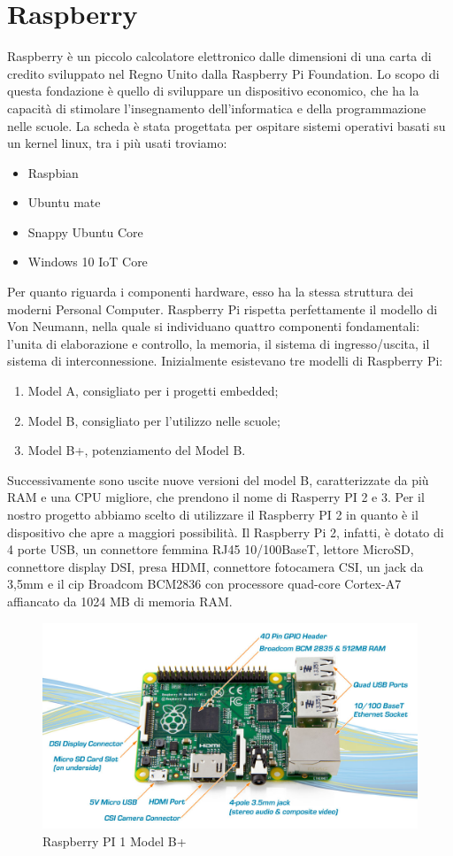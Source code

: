 \section{Raspberry}
Raspberry è un piccolo calcolatore elettronico dalle dimensioni di una
carta di credito sviluppato nel Regno Unito dalla Raspberry Pi
Foundation. Lo scopo di questa fondazione è quello di sviluppare un
dispositivo economico, che ha la capacità di stimolare l'insegnamento
dell'informatica e della programmazione nelle scuole. La scheda è stata
progettata per ospitare sistemi operativi basati su un kernel linux, tra i
più usati troviamo:
\begin{itemize}
\item Raspbian
\item Ubuntu mate
\item Snappy Ubuntu Core
\item Windows 10 IoT Core
\end{itemize}
Per quanto riguarda i componenti hardware, esso ha la stessa struttura
dei moderni Personal Computer. Raspberry Pi rispetta perfettamente il
modello di Von Neumann, nella quale si individuano quattro componenti
fondamentali: l'unita di elaborazione e controllo, la memoria, il sistema
di ingresso/uscita, il sistema di interconnessione. Inizialmente esistevano tre modelli di Raspberry Pi:
\begin{enumerate}
\item Model A, consigliato per i progetti embedded;
\item Model B, consigliato per l'utilizzo nelle scuole;
\item Model B+, potenziamento del Model B.
\end{enumerate}
Successivamente sono uscite nuove versioni del model B, caratterizzate da più RAM e una CPU migliore, che prendono il nome di Rasperry PI 2 e 3.
Per il nostro progetto abbiamo scelto di utilizzare il Raspberry PI 2 in
quanto è il dispositivo che apre a maggiori possibilità. Il Raspberry Pi 2,
infatti, è dotato di 4 porte USB, un connettore femmina RJ45
10/100BaseT, lettore MicroSD, connettore display DSI, presa HDMI,
connettore fotocamera CSI, un jack da 3,5mm e il cip Broadcom
BCM2836 con processore quad-core Cortex-A7 affiancato da 1024 MB di
memoria RAM.
\begin{figure}[h]
\centering
\includegraphics[scale=0.3]{Immagini/raspberry.png}
\caption{Raspberry PI 1 Model B+}
\end{figure}

